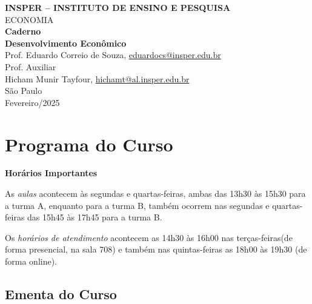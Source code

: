 \documentclass[a4paper,12pt]{article}[abntex2]
\begin{document}
\begin{titlepage}
    \centering
    \vspace*{1cm}
    \Large\textbf{INSPER – INSTITUTO DE ENSINO E PESQUISA}\\
    \Large ECONOMIA\\
    \vspace{1.5cm}
    \Large\textbf{Caderno}\\
    \textbf{Desenvolvimento Econômico}\\
    \vspace{1.5cm}
    Prof. Eduardo Correio de Souza, \href{mailto:eduardocs@insper.edu.br}{eduardocs@insper.edu.br} \\
    Prof. Auxiliar  \\
    \vfill
    \normalsize
    Hicham Munir Tayfour, \href{mailto:hichamt@al.insper.edu.br}{hichamt@al.insper.edu.br}\\

    \vfill
    São Paulo\\
    Fevereiro/2025
\end{titlepage}

\newpage
\tableofcontents
\thispagestyle{empty} %

\newpage 
\listoffigures
\thispagestyle{empty} %

\newpage
\setcounter{page}{1} %
\justify
\onehalfspacing


\section*{\textbf{Programa do Curso}}

\textbf{Horários Importantes}

As \textit{aulas} acontecem às segundas e quartas-feiras, ambas das 13h30 às 15h30 para a turma A, enquanto para a turma B, também ocorrem nas segundas e quartas-feiras das 15h45 às 17h45 para a turma B. 

Os \textit{horários de atendimento} acontecem as 14h30 às 16h00 nas terças-feiras(de forma presencial, na sala 708) e também nas quintas-feiras as 18h00 às 19h30 (de forma online).

\subsection*{\textbf{Ementa do Curso}}
\end{document}

